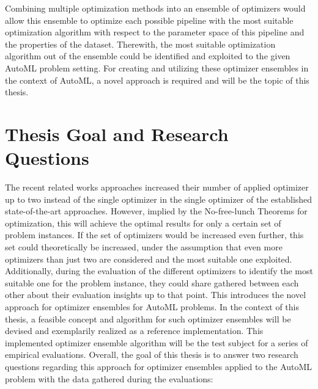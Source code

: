 Combining multiple optimization methods into an ensemble of optimizers would allow this ensemble to optimize each possible pipeline with the most suitable optimization algorithm with respect to the parameter space of this pipeline and the properties of the dataset.
Therewith, the most suitable optimization algorithm out of the ensemble could be identified and exploited to the given AutoML problem setting.\newline
For creating and utilizing these optimizer ensembles in the context of AutoML, a novel approach is required and will be the topic of this thesis. 

\section{Thesis Goal and Research Questions}
\label{sec:intro:goal}
The recent related works approaches increased their number of applied optimizer up to two instead of the single optimizer in the single optimizer of the established state-of-the-art approaches.
However, implied by the No-free-lunch Theorems for optimization, this will achieve the optimal results for only a certain set of problem instances.
If the set of optimizers would be increased even further, this set could theoretically be increased, under the assumption that even more optimizers than just two are considered and the most suitable one exploited.
Additionally, during the evaluation of the different optimizers to identify the most suitable one for the problem instance, they could share gathered between each other about their evaluation insights up to that point.
This introduces the novel approach for optimizer ensembles for AutoML problems.\newline
In the context of this thesis, a feasible concept and algorithm for such optimizer ensembles will be devised and exemplarily realized as a reference implementation.
This  implemented optimizer ensemble algorithm will be the test subject for a series of empirical evaluations.\newline
Overall, the goal of this thesis is to answer two research questions regarding this approach for optimizer ensembles applied to the AutoML problem with the data gathered during the evaluations:
